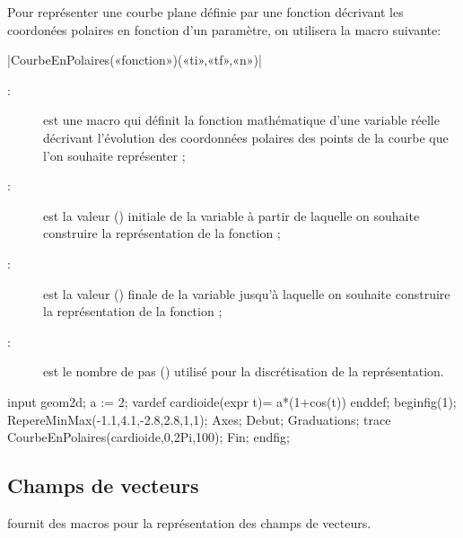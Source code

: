 \documentclass[a4paper,french]{article}
\begin{document}
  Pour représenter une courbe plane définie par une fonction décrivant les
  coordonées polaires en fonction d'un paramètre, on utilisera la macro suivante:
  \begin{colourband}
    \macro|CourbeEnPolaires(«fonction»)(«ti»,«tf»,«n»)|
    \begin{description}
      \item[:] est une macro \MP{} qui définit la fonction
      mathématique d'une variable réelle décrivant l'évolution des coordonnées polaires des
      points de la courbe que l'on souhaite représenter ;
      \item[:] est la valeur () initiale de la variable à
      partir de laquelle on souhaite construire la représentation de la fonction ;
      \item[:] est la valeur () finale de la variable
      jusqu'à laquelle on souhaite construire la représentation de la fonction ;
      \item[:] est le nombre de pas () utilisé pour la
      discrétisation de la représentation.
    \end{description}
  \end{colourband}

  \begin{ExempleMP}
input geom2d;
a := 2;
vardef cardioide(expr t)= a*(1+cos(t)) enddef;
beginfig(1);
RepereMinMax(-1.1,4.1,-2.8,2.8,1,1);
Axes;
Debut;
  Graduations;
  trace CourbeEnPolaires(cardioide,0,2Pi,100);
Fin;
endfig;
    \end{ExempleMP}


\subsection{Champs de vecteurs}

\mpgeomdd fournit des macros pour la représentation des champs de vecteurs.
\end{document}
